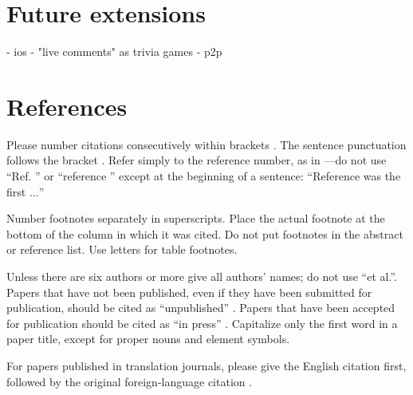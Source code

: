 \documentclass[conference]{IEEEtran}
\begin{document}
\section{Future extensions}

- ios
- "live comments" as trivia games
- p2p






\section*{References}

Please number citations consecutively within brackets \cite{b1}. The 
sentence punctuation follows the bracket \cite{b2}. Refer simply to the reference 
number, as in \cite{b3}---do not use ``Ref. \cite{b3}'' or ``reference \cite{b3}'' except at 
the beginning of a sentence: ``Reference \cite{b3} was the first $\ldots$''

Number footnotes separately in superscripts. Place the actual footnote at 
the bottom of the column in which it was cited. Do not put footnotes in the 
abstract or reference list. Use letters for table footnotes.

Unless there are six authors or more give all authors' names; do not use 
``et al.''. Papers that have not been published, even if they have been 
submitted for publication, should be cited as ``unpublished'' \cite{b4}. Papers 
that have been accepted for publication should be cited as ``in press'' \cite{b5}. 
Capitalize only the first word in a paper title, except for proper nouns and 
element symbols.

For papers published in translation journals, please give the English 
citation first, followed by the original foreign-language citation \cite{b6}.
\end{document}
